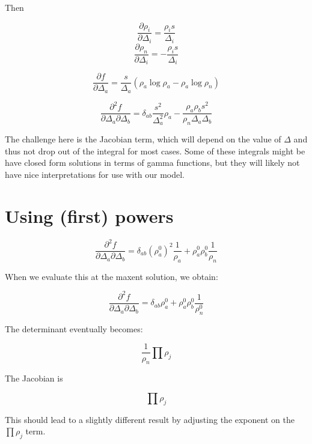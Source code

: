 \documentclass[12pt]{article}
\begin{document}
Then

$$\frac{\partial \rho_i}{\partial \Delta_i} = \frac{\rho_i s}{\Delta_i}$$
$$\frac{\partial \rho_n}{\partial \Delta_i} = -\frac{\rho_i s}{\Delta_i}$$

$$\frac{\partial f}{\partial \Delta_a} = \frac{s}{\Delta_a}(\rho_a \log \rho_a - \rho_a \log \rho_n)$$

$$\frac{\partial^2 f}{\partial \Delta_a \partial \Delta_b} = \delta_{ab} \frac{s^2}{\Delta_a^2} \rho_a - \frac{\rho_a \rho_b s^2 }{\rho_n \Delta_a \Delta_b}$$

The challenge here is the Jacobian term, which will depend on the value of $\Delta$ and thus not drop out of the integral for most cases.  Some of these integrals might be have closed form solutions in terms of gamma functions, but they will likely not have nice interpretations for use with our model.

\section{Using (first) powers}

$$\frac{\partial^2 f}{\partial \Delta_a \partial \Delta_b} = \delta_{ab} (\rho_a^0)^2 \frac{1}{\rho_a} + \rho_a^0 \rho_b^0 \frac{1}{\rho_n}$$

When we evaluate this at the maxent solution, we obtain:

$$\frac{\partial^2 f}{\partial \Delta_a \partial \Delta_b} = \delta_{ab} \rho_a^0 + \rho_a^0 \rho_b^0 \frac{1}{\rho_n^0}$$

The determinant eventually becomes:

$$\frac{1}{\rho_n} \prod \rho_j$$

The Jacobian is 

$$\prod \rho_j$$

This should lead to a slightly different result by adjusting the exponent on the $\prod \rho_j$ term.
\end{document}
